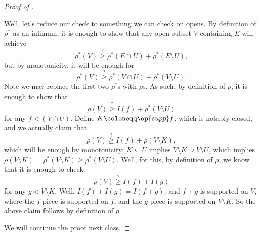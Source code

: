 \documentclass[../notes.tex]{subfiles}
\begin{document}
\begin{proof}[Proof of ]
\begin{enumerate}
		Well, let's reduce our check to something we can check on opens. By definition of $\rho^*$ as an infimum, it is enough to show that any open subset $V$ containing $E$ will achieve
		\[\rho^*(V)\stackrel?\ge\rho^*(E\cap U)+\rho^*(E\setminus U),\]
		but by monotonicity, it will be enough for
		\[\rho^*(V)\stackrel?\ge\rho^*(V\cap U)+\rho^*(V\setminus U).\]
		Note we may replace the first two $\rho^*$s with $\rho$s. As such, by definition of $\rho$, it is enough to show that
		\[\rho(V)\stackrel?\ge I(f)+\rho^*(V\setminus U)\]
		for any $f<(V\cap U)$. Define $K\coloneqq\op{supp}f$, which is notably closed, and we actually claim that
		\[\rho(V)\stackrel?\ge I(f)+\rho(V\setminus K),\]
		which will be enough by monotonicity: $K\subseteq U$ implies $V\setminus K\supseteq V\setminus U$, which implies $\rho(V\setminus K)=\rho^*(V\setminus K)\ge\rho^*(V\setminus U)$. Well, for this, by definition of $\rho$, we know that it is enough to check
		\[\rho(V)\stackrel?\ge I(f)+I(g)\]
		for any $g<V\setminus K$. Well, $I(f)+I(g)=I(f+g)$, and $f+g$ is supported on $V$, where the $f$ piece is supported on $f$, and the $g$ piece is supported on $V\setminus K$. So the above claim follows by definition of $\rho$.
	\end{enumerate}
	We will continue the proof next class.
\end{proof}
\end{document}
